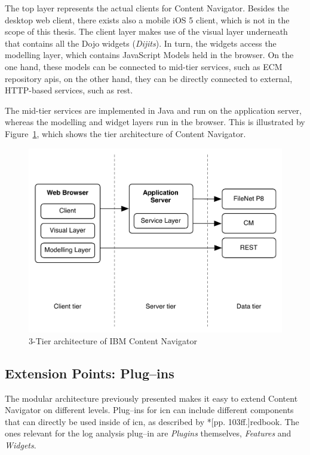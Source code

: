The top layer represents the actual clients for Content Navigator. Besides the desktop web client, there exists also a mobile iOS 5 client, which is not in the scope of this thesis. The client layer makes use of the visual layer underneath that contains all the Dojo widgets (\emph{Dijits}). In turn, the widgets access the modelling layer, which contains JavaScript Models held in the browser. On the one hand, these models can be connected to mid-tier services, such as ECM repository \glspl{api}, on the other hand, they can be directly connected to external, HTTP-based services, such as \ac{rest}.

The mid-tier services are implemented in Java and run on the application server, whereas the modelling and widget layers run in the browser. This is illustrated by Figure~\ref{fig:nexustiers}, which shows the tier architecture of Content Navigator.

\begin{figure}[H]
	\centering
	\includegraphics[width=14cm]{images/tiers.pdf}
	\caption{3-Tier architecture of IBM Content Navigator}
	\label{fig:nexustiers}
\end{figure}

\subsection{Extension Points: Plug--ins}
\label{sec:plugincomponents}
The modular architecture previously presented makes it easy to extend Content Navigator on different levels. Plug--ins for \ac{icn} can include different components that can directly be used inside of \ac{icn}, as described by \citeasnoun**[pp. 103ff.]{redbook}. The ones relevant for the log analysis plug--in are \emph{Plugins} themselves, \emph{Features} and \emph{Widgets}.

